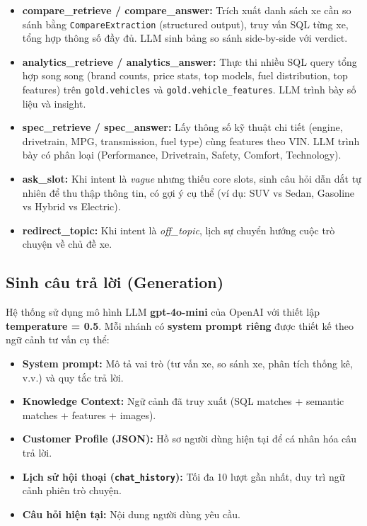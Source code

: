 \begin{itemize}
    \item \textbf{compare\_retrieve / compare\_answer:} Trích xuất danh sách xe cần so sánh bằng \texttt{CompareExtraction} (structured output), truy vấn SQL từng xe, tổng hợp thông số đầy đủ. LLM sinh bảng so sánh side-by-side với verdict.

    \item \textbf{analytics\_retrieve / analytics\_answer:} Thực thi nhiều SQL query tổng hợp song song (brand counts, price stats, top models, fuel distribution, top features) trên \texttt{gold.vehicles} và \texttt{gold.vehicle\_features}. LLM trình bày số liệu và insight.

    \item \textbf{spec\_retrieve / spec\_answer:} Lấy thông số kỹ thuật chi tiết (engine, drivetrain, MPG, transmission, fuel type) cùng features theo VIN. LLM trình bày có phân loại (Performance, Drivetrain, Safety, Comfort, Technology).

    \item \textbf{ask\_slot:} Khi intent là \textit{vague} nhưng thiếu core slots, sinh câu hỏi dẫn dắt tự nhiên để thu thập thông tin, có gợi ý cụ thể (ví dụ: SUV vs Sedan, Gasoline vs Hybrid vs Electric).

    \item \textbf{redirect\_topic:} Khi intent là \textit{off\_topic}, lịch sự chuyển hướng cuộc trò chuyện về chủ đề xe.
\end{itemize}

\subsection{Sinh câu trả lời (Generation)}

Hệ thống sử dụng mô hình LLM \textbf{gpt-4o-mini} của OpenAI với thiết lập \textbf{temperature = 0.5}. Mỗi nhánh có \textbf{system prompt riêng} được thiết kế theo ngữ cảnh tư vấn cụ thể:

\begin{itemize}[noitemsep, topsep=2pt]
    \item \textbf{System prompt:} Mô tả vai trò (tư vấn xe, so sánh xe, phân tích thống kê, v.v.) và quy tắc trả lời.
    \item \textbf{Knowledge Context:} Ngữ cảnh đã truy xuất (SQL matches + semantic matches + features + images).
    \item \textbf{Customer Profile (JSON):} Hồ sơ người dùng hiện tại để cá nhân hóa câu trả lời.
    \item \textbf{Lịch sử hội thoại (\texttt{chat\_history}):} Tối đa 10 lượt gần nhất, duy trì ngữ cảnh phiên trò chuyện.
    \item \textbf{Câu hỏi hiện tại:} Nội dung người dùng yêu cầu.
\end{itemize}

